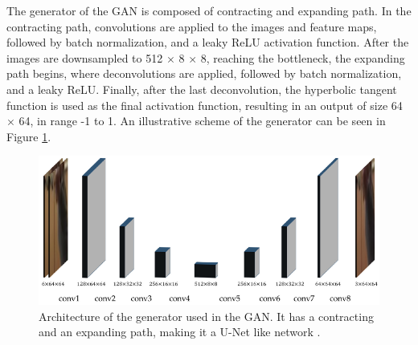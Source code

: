 The generator of the GAN is composed of contracting and expanding path. In the contracting path, convolutions are applied to the images and feature maps, followed by batch normalization, and a leaky ReLU activation function. After the images are downsampled to 512 $\times$ 8 $\times$ 8, reaching the bottleneck, the expanding path begins, where deconvolutions are applied, followed by batch normalization, and a leaky ReLU. Finally, after the last deconvolution, the hyperbolic tangent function is used as the final activation function, resulting in an output of size 64 $\times$ 64, in range -1 to 1. An illustrative scheme of the generator can be seen in Figure \ref{fig:GeneratorArchitecture}.

\begin{figure}
	\centering
	\includegraphics[width=1.0\linewidth]{figures/GeneratorArchitecture}
	\caption{Architecture of the generator used in the GAN. It has a contracting and an expanding path, making it a U-Net like network \parencite{Tran2020}.}
	\label{fig:GeneratorArchitecture}
\end{figure}


